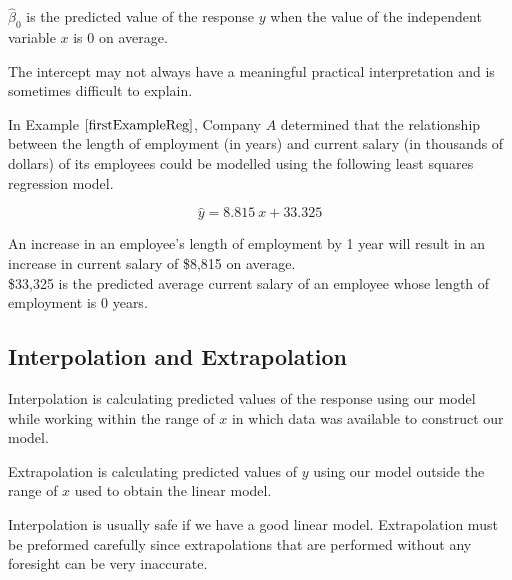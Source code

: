 \begin{definition}
\label{definitionIntercept}	
$\hat{\beta}_{0}$ is the
predicted value of the response $y$ when the
value of the independent variable $x$ is 0 on average.
\end{definition}
\hfill

\noindent
The intercept may not always have a meaningful practical interpretation
and is sometimes difficult to explain.

\begin{example}
In Example $\ref{firstExampleReg}$, Company $A$ determined that the relationship between the length of employment (in years) and current salary (in thousands of dollars) of its employees could be modelled using the following least squares regression model.

\[ \hat{y} = 8.815~x + 33.325 \]

An increase in an employee's length of employment by 1 year will result in an increase in current salary of \$8,815 on average. \\

\$33,325 is the predicted average current salary of an employee whose length of employment is 0 years.
\end{example}


\subsection{Interpolation and Extrapolation}


\begin{definition}[Interpolation]	
Interpolation is calculating predicted values of the response using our 
model while working within the range of $x$ in which data was available to construct our model.
\end{definition}
\hfill

\begin{definition}[Extrapolation]	
Extrapolation is calculating predicted values of $y$ using our model outside the range of $x$ 
used to obtain the linear model.
\end{definition}
\hfill

Interpolation is usually safe if we have a good linear model.
Extrapolation must be preformed carefully since extrapolations 
that are performed without any foresight can be very inaccurate.

